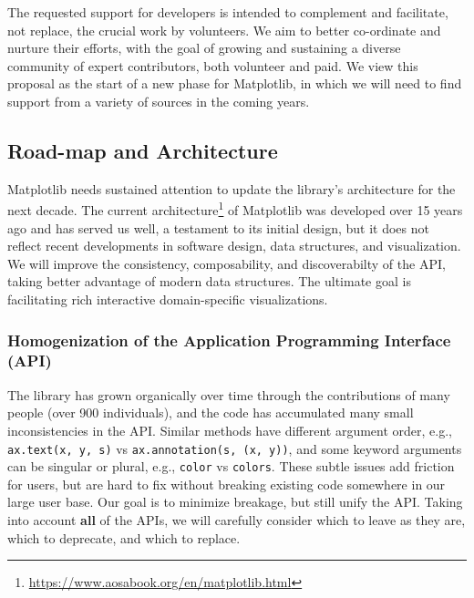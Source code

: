\documentclass[11pt,letterpaper]{article}  %
\begin{document}
The requested support for developers is intended to complement and
facilitate, not replace, the crucial work by volunteers.  We aim to
better co-ordinate and nurture their
efforts, with the goal of growing and sustaining a diverse community
of expert contributors, both volunteer and paid.  We view
this proposal as the start of a new phase for Matplotlib, in which we
will need to find support from a variety of sources in the coming years.



\subsection{Road-map and Architecture}

Matplotlib needs sustained attention to update the library's
architecture for the next decade.
The current
architecture\footnote{\url{https://www.aosabook.org/en/matplotlib.html}}
of Matplotlib was developed over 15 years ago \cite{Hunter:2007} and has served
us well, a testament to its initial design, but it
does not reflect recent developments in software design, data
structures, and visualization.
We will improve the consistency, composability, and discoverabilty of the API,
taking better advantage of modern data structures.  The
ultimate goal is facilitating rich interactive domain-specific visualizations.



\subsubsection{Homogenization of the Application Programming Interface (API)}
\label{sec:api_hom}
The library has grown organically over time through the contributions
of many people (over 900 individuals), and the code has accumulated
many small inconsistencies in the API.  Similar methods have different
argument order, e.g., \texttt{ax.text(x, y, s)} vs
\texttt{ax.annotation(s, (x, y))}, and some keyword arguments can be
singular or plural, e.g., \texttt{color} vs \texttt{colors}.  These
subtle issues add friction for users, but are hard to fix without
breaking existing code somewhere in our large user base.  Our goal is
to minimize breakage, but still unify the API.  Taking into account
\textbf{all} of the APIs, we will carefully consider which to leave as
they are, which to deprecate, and which to replace.
\end{document}
